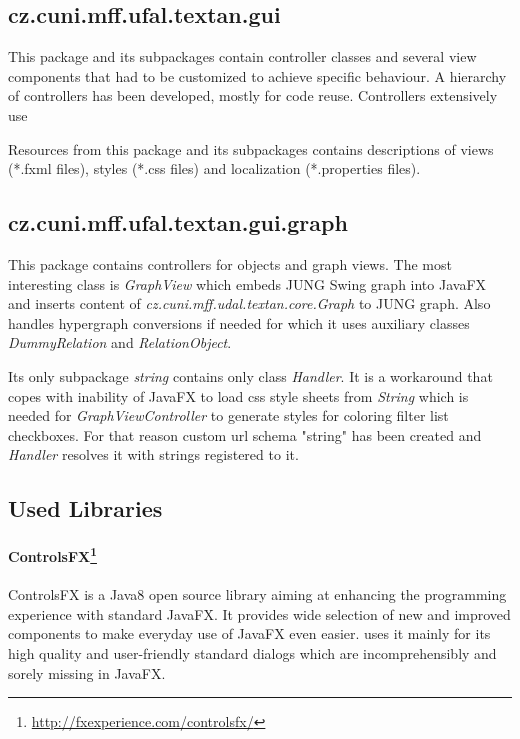 \subsection{cz.cuni.mff.ufal.textan.gui}

This package and its subpackages contain controller classes and several view
components that had to be customized to achieve specific behaviour. A hierarchy
of controllers has been developed, mostly for code reuse. Controllers extensively use 


Resources from this package and its subpackages contains descriptions of views
(*.fxml files), styles (*.css files) and localization (*.properties files).


\subsection{cz.cuni.mff.ufal.textan.gui.graph}

This package contains controllers for objects and graph views. The most
interesting class is \emph{GraphView} which embeds JUNG Swing graph into JavaFX
and inserts content of \emph{cz.cuni.mff.udal.textan.core.Graph} to JUNG graph.
Also handles hypergraph conversions if needed for which it uses auxiliary
classes \emph{DummyRelation} and \emph{RelationObject}.

Its only subpackage \emph{string} contains only class \emph{Handler}. It is a
workaround that copes with inability of JavaFX to load css style sheets from
\emph{String} which is needed for \emph{GraphViewController} to generate styles
for coloring filter list checkboxes. For that reason custom url schema "string"
has been created and \emph{Handler} resolves it with strings registered to it.

\subsection{Used Libraries}
\label{ssec:UsedLibraries}


\paragraph{ControlsFX\footnote{\url{http://fxexperience.com/controlsfx/}}}
ControlsFX is a Java8 open source library aiming at enhancing the programming
experience with standard JavaFX. It provides wide selection of new and improved
components to make everyday use of JavaFX even easier. \textan{} uses it mainly
for its high quality and user-friendly standard dialogs which are
incomprehensibly and sorely missing in JavaFX.

